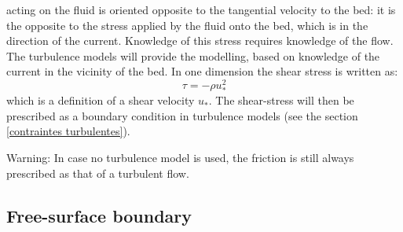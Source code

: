 acting on the fluid is oriented opposite to the tangential velocity to the bed:
it is the opposite to the stress applied by the fluid onto the bed, which
is in the direction of the current.
Knowledge of this stress requires knowledge of the flow.
The turbulence models will provide the modelling, based on knowledge of the current in the vicinity of the bed.
In one dimension the shear stress is written as:
\begin{equation}
  \tau=-\rho u_*^{2}%
\end{equation}
which is a definition of a shear velocity $u_{\ast}$.
The shear-stress will then be prescribed as a boundary condition in turbulence models
(see the section \ref{contraintes turbulentes}).

\begin{WarningBlock}{Warning:}
In case no turbulence model is used, the friction is still always prescribed as that of a turbulent flow.
\end{WarningBlock}
\subsection{Free-surface boundary}

